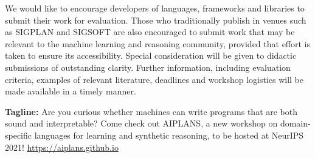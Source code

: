 \documentclass{article}
\begin{document}
    We would like to encourage developers of languages, frameworks and libraries to submit their work for evaluation. Those who traditionally publish in venues such as SIGPLAN and SIGSOFT are also encouraged to submit work that may be relevant to the machine learning and reasoning community, provided that effort is taken to ensure its accessibility. Special consideration will be given to didactic submissions of outstanding clarity. Further information, including evaluation criteria, examples of relevant literature, deadlines and workshop logistics will be made available in a timely manner.

   \textbf{Tagline:} Are you curious whether machines can write programs that are both sound and interpretable? Come check out AIPLANS, a new workshop on domain-specific languages for learning and synthetic reasoning, to be hosted at NeurIPS 2021! \url{https://aiplans.github.io}
\end{document}
